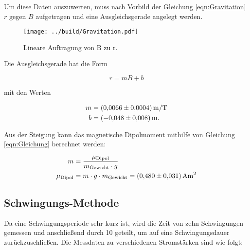 \noindent Um diese Daten auszuwerten, muss nach Vorbild der Gleichung \eqref{eqn:Gravitation} $r$ gegen $B$ aufgetragen und eine 
Ausgleichsgerade angelegt werden.

\begin{figure}[H]
    \texttt{[image: ../build/Gravitation.pdf]}
    \caption{Lineare Auftragung von B zu r.}  
\end{figure}

\noindent Die Ausgleichsgerade hat die Form 

\begin{equation*}
    r = m B + b
\end{equation*}

\noindent mit den Werten

\begin{align*}
    m &= \qty{0.0066 \pm 0.0004}{\unit{\meter \per \tesla}} \\
    b &= \qty{-0.048 \pm 0.008}{\unit{\meter}}.
\end{align*}

\noindent Aus der Steigung kann das magnetische Dipolmoment mithilfe von Gleichung \eqref{eqn:Gleichung} 
berechnet werden:

\begin{align*}
    m &= \frac{\mu_\text{Dipol}}{m_\text{Gewicht} \cdot g} \\
    \mu_\text{Dipol} &= m \cdot g \cdot m_\text{Gewicht} = \qty{0.480 \pm 0.031}{\unit{\ampere \meter \squared}} 
\end{align*}


\subsection{Schwingungs-Methode}

Da eine Schwingungsperiode sehr kurz ist, wird die Zeit von zehn Schwingungen gemessen und anschließend durch 10 geteilt, 
um auf eine Schwingungsdauer zurückzuschließen. Die Messdaten zu verschiedenen Stromstärken sind wie folgt: 

